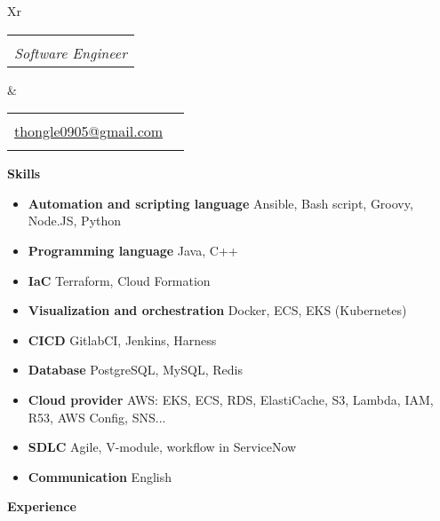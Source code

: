 \documentclass[letterpaper,12pt]{article}[leftmargin=*]
\makeatletter
\def \fullname {Thong Le Hoang}
\def \subtitle {Software Engineer}
\def \phoneicon {\faPhone}
\def \phonetext {+84-347-023-047}
\def \emailicon {\faEnvelope}
\def \emaillink {mailto:thongle0905@gmail.com}
\def \emailtext {thongle0905@gmail.com}
\def \addressicon {\faHome}
\def \addresstext {Ho Chi Minh, Viet Nam}
\def \headertype {\doublecol} %
\def \entryspacing {5pt}
\def \linkedin {\linkedinicon \hspace{3pt}\href{\linkedinlink}{\linkedintext}}
\def \phone {\phoneicon \hspace{3pt}{ \phonetext}}
\def \address {\addressicon \hspace{3pt}{ \addresstext}}
\def \email {\emailicon \hspace{3pt}\href{\emaillink}{\emailtext}}
\def \github {\githubicon \hspace{3pt}\href{\githublink}{\githubtext}}
\def \website {\websiteicon \hspace{3pt}\href{\websitelink}{\websitetext}}
\renewcommand{\section}[2]{\vspace{5pt}
  \colorbox{secondary}{\color{white}\raggedbottom\normalsize\textbf{{#1}{\hspace{7pt}#2}}}
}
\newcommand{\resumeEntryStart}{\begin{itemize}[leftmargin=2.5mm]}
\newcommand{\resumeEntryEnd}{\end{itemize}\vspace{\entryspacing}}
\newcommand{\resumeEntryS}[2]{
  \item[]\small{
    \textbf{\color{primary}#1 }{ #2 \vspace{-6pt}}
  }
}
\newcommand{\doublecol}[6]{
  \begin{tabularx}{\textwidth}{Xr}
    {
      \begin{tabular}[c]{l}
        \fontsize{35}{45}\selectfont{\color{primary}{{\textbf{\fullname}}}} \\
        {\textit{\subtitle}} %
      \end{tabular}
    } & {
      \begin{tabular}[c]{l@{\hspace{1.5em}}l}
        {\small#4} & {\small#1} \\
        {\small#5} & {\small#2} \\
        {\small#6} & {\small#3}
      \end{tabular}
    }
  \end{tabularx}
}
\newcommand{\singlecol}[6]{
  \begin{tabularx}{\textwidth}{Xr}
    {
      \begin{tabular}[b]{l}
        \fontsize{35}{45}\selectfont{\color{primary}{{\textbf{\fullname}}}} \\
        {\textit{\subtitle}} %
      \end{tabular}
    } & {
      \begin{tabular}[c]{l}
        {\small#1} \\
        {\small#2} \\
        {\small#3} \\
        {\small#4} \\
        {\small#5} \\
        {\small#6}
      \end{tabular}
    }
  \end{tabularx}
}
\makeatother
\begin{document}


\headertype{\linkedin}{\github}{\website}{\phone}{\email}{\address} %
\vspace{10pt} %

\section{\faChartLine}{Skills}
 \resumeEntryStart
  \resumeEntryS{Automation and scripting language } {Ansible, Bash script, Groovy, Node.JS, Python}
  \resumeEntryS{Programming language } {Java, C++}
  \resumeEntryS{IaC } {Terraform, Cloud Formation}
  \resumeEntryS{Visualization and orchestration } {Docker, ECS, EKS (Kubernetes)}
  \resumeEntryS{CICD } {GitlabCI, Jenkins, Harness}
  \resumeEntryS{Database } {PostgreSQL, MySQL, Redis}
  \resumeEntryS{Cloud provider } {AWS: EKS, ECS, RDS, ElastiCache, S3, Lambda, IAM, R53, AWS Config, SNS...}
  \resumeEntryS{SDLC } {Agile, V-module, workflow in ServiceNow}
  \resumeEntryS{Communication } {English}
 \resumeEntryEnd

\section{\faBriefcase}{Experience}
\end{document}
